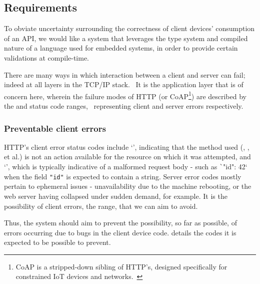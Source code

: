 \subsection{Requirements} \label{intro:req}

To obviate uncertainty surrounding the correctness of client devices' consumption of an API, we would like a system that leverages the type system and compiled nature of a language used for embedded systems, in order to provide certain validations at compile-time.

There are many ways in which interaction between a client and server can fail; indeed at all layers in the TCP/IP stack.~\cite{networks_distributed_systems} It is the application layer that is of concern here, wherein the failure modes of HTTP (or CoAP\footnote{CoAP is a stripped-down sibling of HTTP's, designed specifically for constrained IoT devices and networks.~\cite{rfc7252}}) are described by the  and  status code ranges,~\cite{rfc7231,rfc7252} representing client and server errors respectively.

\subsubsection{Preventable client errors} \label{intro:req:preventable}
HTTP's client error status codes include `', indicating that the method used (, , et al.) is not an action available for the resource on which it was attempted, and `', which is typically indicative of a malformed request body - such as \texttt`{"id": 42}` when the field \texttt{"id"} is expected to contain a string. Server error codes mostly pertain to ephemeral issues - unavailability due to the machine rebooting, or the web server having collapsed under sudden demand, for example. It is the possibility of client errors, the  range, that we can aim to avoid. \cite{rfc7231}

Thus, the system should aim to prevent the possibility, so far as possible, of errors occurring due to bugs in the client device code.  details the codes it is expected to be possible to prevent.

